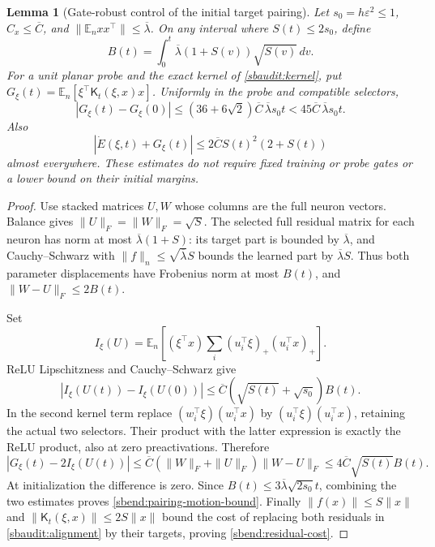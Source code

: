 \documentclass{article} %
\theoremstyle{plain}
\newtheorem{lemma}[theorem]{Lemma}
\theoremstyle{definition}
\theoremstyle{remark}
\begin{document}
\begin{lemma}[Gate-robust control of the initial target pairing]
\label{sbend:pairing-motion}
Let $s_0=h\varepsilon^2\le1$, $C_x\le\overline C$, and
$\|\mathbb E_nxx^\top\|\le\overline\lambda$. On any interval where
$S(t)\le2s_0$, define
\[
 B(t)=\int_0^t\overline\lambda(1+S(v))\sqrt{S(v)}\,dv.
\]
For a unit planar probe and the exact kernel of
\eqref{sbaudit:kernel}, put
$G_\xi(t)=\mathbb E_n[\xi^\top\mathsf K_t(\xi,x)x]$.
Uniformly in the probe and compatible selectors,
\begin{equation}\label{sbend:pairing-motion-bound}
 |G_\xi(t)-G_\xi(0)|
 \le(36+6\sqrt2)\overline C\,\overline\lambda s_0t
 <45\overline C\,\overline\lambda s_0t.
\end{equation}
Also
\begin{equation}\label{sbend:residual-cost}
 |\dot E(\xi,t)+G_\xi(t)|
 \le2\overline C S(t)^2(2+S(t))
\end{equation}
almost everywhere. These estimates do not require fixed training or probe
gates or a lower bound on their initial margins.
\end{lemma}
\begin{proof}
Use stacked matrices $U,W$ whose columns are the full neuron vectors.
Balance gives $\|U\|_F=\|W\|_F=\sqrt S$. The selected full residual
matrix for each neuron has norm at most
$\overline\lambda(1+S)$: its target part is bounded by
$\overline\lambda$, and Cauchy--Schwarz with
$\|f\|_n\le\sqrt{\overline\lambda}S$ bounds the learned part by
$\overline\lambda S$. Thus both parameter displacements have Frobenius
norm at most $B(t)$, and $\|W-U\|_F\le2B(t)$.

Set
\[
 I_\xi(U)=\mathbb E_n\left[(\xi^\top x)
             \sum_i(u_i^\top\xi)_+(u_i^\top x)_+\right].
\]
ReLU Lipschitzness and Cauchy--Schwarz give
\[
 |I_\xi(U(t))-I_\xi(U(0))|
 \le\overline C(\sqrt{S(t)}+\sqrt{s_0})B(t).
\]
In the second kernel term replace
$(w_i^\top\xi)(w_i^\top x)$ by
$(u_i^\top\xi)(u_i^\top x)$, retaining the actual two selectors.
Their product with the latter expression is exactly the ReLU product,
also at zero preactivations. Therefore
\[
 |G_\xi(t)-2I_\xi(U(t))|
 \le\overline C(\|W\|_F+\|U\|_F)\|W-U\|_F
 \le4\overline C\sqrt{S(t)}B(t).
\]
At initialization the difference is zero. Since
$B(t)\le3\overline\lambda\sqrt{2s_0}t$, combining the two estimates
proves \eqref{sbend:pairing-motion-bound}. Finally
$\|f(x)\|\le S\|x\|$ and
$\|\mathsf K_t(\xi,x)\|\le2S\|x\|$ bound the cost of replacing both
residuals in \eqref{sbaudit:alignment} by their targets, proving
\eqref{sbend:residual-cost}.
\end{proof}
\end{document}
